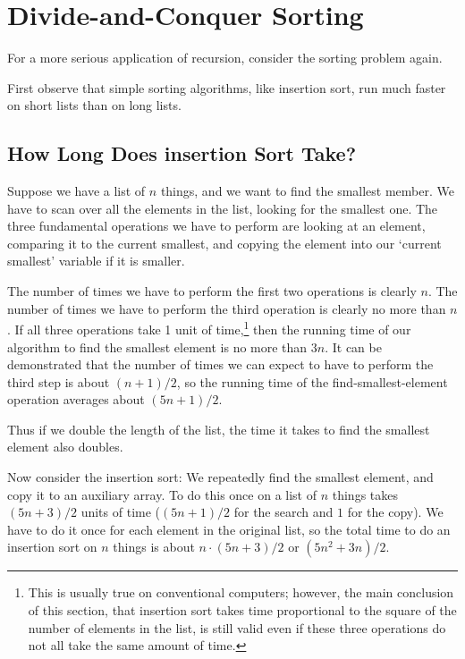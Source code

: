 %
%
%

\section{Divide-and-Conquer Sorting}

For a more serious application of recursion, consider the sorting
problem again.

First observe that simple sorting algorithms, like insertion sort, run much
faster on short lists than on long lists.

\subsection{How Long Does insertion Sort Take?}

    Suppose we have a list of $n$ things, and we want to find the
smallest member.  We have to scan over all the elements in the list,
looking for the smallest one.  The three fundamental operations we have
to perform are looking at an element, comparing it to the current
smallest, and copying the element into our `current smallest' variable
if it is smaller.

    The number of times we have to perform the first two operations is
clearly $n$.  The number of times we have to perform the third operation
is clearly no more than $n$.  If all three operations take 1 unit of
time,\footnote{This is usually true on conventional computers; however,
the main conclusion of this section, that insertion sort takes time
proportional to the square of the number of elements in the list, is
still valid even if these three operations do not all take the same
amount of time.} then the running time of our algorithm to find the
smallest element is no more than $3n$.  It can be demonstrated that the
number of times we can expect to have to perform the third step is about
$(n+1) / 2$, so the running time of the find-smallest-element operation
averages about $(5n+1) / 2$.

Thus if we double the length of the list, the time it takes to find the
smallest element also doubles.

Now consider the insertion sort: We repeatedly find the smallest
element, and copy it to an auxiliary array.  To do this once on a list
of $n$ things takes $(5n + 3) / 2$ units of time ($(5n+1) / 2$ for the
search and $1$ for the copy).  We have to do it once for each element in
the original list, so the total time to do an insertion sort on $n$
things is about $n\cdot (5n+3)/2$ or $(5n^2 + 3n) / 2$.  

